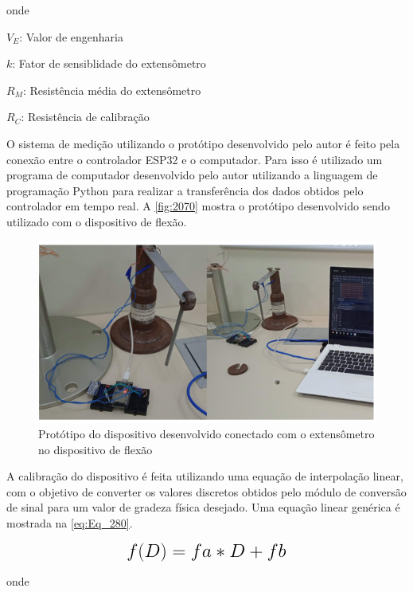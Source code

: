 onde

$V_{E}$: Valor de engenharia

$k$: Fator de sensiblidade do extensômetro

$R_{M}$: Resistência média do extensômetro

$R_{C}$: Resistência de calibração

\hfill

O sistema de medição utilizando o protótipo desenvolvido pelo autor é feito pela conexão entre o controlador ESP32 e o computador.
Para isso é utilizado um programa de computador desenvolvido pelo autor utilizando a linguagem de programação Python para realizar a transferência
dos dados obtidos pelo controlador em tempo real.
A \autoref{fig:2070} mostra o protótipo desenvolvido sendo utilizado com o dispositivo de flexão.

\begin{figure}[htb]
	\caption{\label{fig:2070} Protótipo do dispositivo desenvolvido conectado com o extensômetro no dispositivo de flexão}
	\begin{center}
		\includegraphics[width=\textwidth]{pictures/2070.png}
	\end{center}
\end{figure}

A calibração do dispositivo é feita utilizando uma equação de interpolação linear, com o objetivo de converter os valores discretos obtidos pelo módulo de conversão
de sinal para um valor de gradeza física desejado.
Uma equação linear genérica é mostrada na \autoref{eq:Eq_280}.

\begin{equation}\label{eq:Eq_280}%
\mbox{\fontsize{17.28}{21.6}\selectfont\( %
f(D) = fa * D + fb
\)} %
\end{equation}

onde

